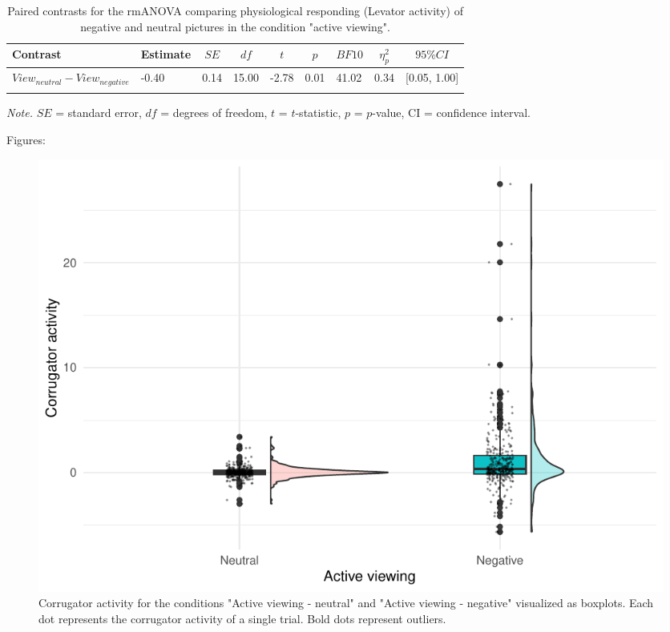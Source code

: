 \documentclass[
  man,floatsintext]{apa6}
\begin{document}
\begin{table}[H]

\begin{center}
\begin{threeparttable}

\caption{\label{tab:unnamed-chunk-7}Paired contrasts for the rmANOVA comparing physiological responding (Levator activity) of negative and neutral pictures in the condition "active viewing".}

\begin{tabular}{lllllllll}
\toprule
Contrast & \multicolumn{1}{c}{Estimate} & \multicolumn{1}{c}{$SE$} & \multicolumn{1}{c}{$df$} & \multicolumn{1}{c}{$t$} & \multicolumn{1}{c}{$p$} & \multicolumn{1}{c}{$BF10$} & \multicolumn{1}{c}{$\eta_{p}^{2}$} & \multicolumn{1}{c}{$95\% CI$}\\
\midrule
$View_{neutral} - View_{negative}$ & -0.40 & 0.14 & 15.00 & -2.78 & 0.01 & 41.02 & 0.34 & {}[0.05, 1.00]\\
\bottomrule
\addlinespace
\end{tabular}

\begin{tablenotes}[para]
\normalsize{\textit{Note.} $SE$ = standard error, $df$ = degrees of freedom, $t$ = $t$-statistic, $p$ = $p$-value, CI = confidence interval.}
\end{tablenotes}

\end{threeparttable}
\end{center}

\end{table}

Figures:

\begin{figure}[H]
\includegraphics[width=0.75\linewidth]{Manuscript_ERED_Stage2_files/figure-latex/FigEMGCorrViewPilot-1} \caption{Corrugator activity for the conditions "Active viewing - neutral" and "Active viewing - negative" visualized as boxplots. Each dot represents the corrugator activity of a single trial. Bold dots represent outliers.}\label{fig:FigEMGCorrViewPilot}
\end{figure}
\end{document}
